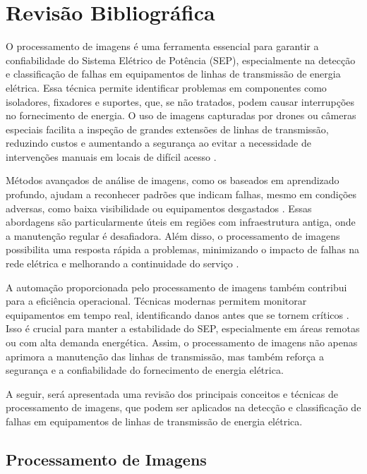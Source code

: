 \chapter{Revisão Bibliográfica}
\label{chap:revisao_bibliografica}

O processamento de imagens é uma ferramenta essencial para garantir a confiabilidade do Sistema Elétrico de Potência (SEP), especialmente na detecção e classificação de falhas em equipamentos de linhas de transmissão de energia elétrica. Essa técnica permite identificar problemas em componentes como isoladores, fixadores e suportes, que, se não tratados, podem causar interrupções no fornecimento de energia. O uso de imagens capturadas por drones ou câmeras especiais facilita a inspeção de grandes extensões de linhas de transmissão, reduzindo custos e aumentando a segurança ao evitar a necessidade de intervenções manuais em locais de difícil acesso \cite{eze2022deep}.

Métodos avançados de análise de imagens, como os baseados em aprendizado profundo, ajudam a reconhecer padrões que indicam falhas, mesmo em condições adversas, como baixa visibilidade ou equipamentos desgastados \cite{Altaie2023}. Essas abordagens são particularmente úteis em regiões com infraestrutura antiga, onde a manutenção regular é desafiadora. Além disso, o processamento de imagens possibilita uma resposta rápida a problemas, minimizando o impacto de falhas na rede elétrica e melhorando a continuidade do serviço \cite{kumar2023novel}.

A automação proporcionada pelo processamento de imagens também contribui para a eficiência operacional. Técnicas modernas permitem monitorar equipamentos em tempo real, identificando danos antes que se tornem críticos \cite{eze2022deep}. Isso é crucial para manter a estabilidade do SEP, especialmente em áreas remotas ou com alta demanda energética. Assim, o processamento de imagens não apenas aprimora a manutenção das linhas de transmissão, mas também reforça a segurança e a confiabilidade do fornecimento de energia elétrica.

A seguir, será apresentada uma revisão dos principais conceitos e técnicas de processamento de imagens, que podem ser aplicados na detecção e classificação de falhas em equipamentos de linhas de transmissão de energia elétrica.

\section{Processamento de Imagens}

